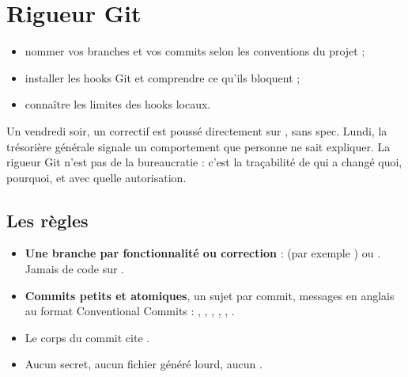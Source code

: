 \chapter{Rigueur Git}\label{ch:git}

\begin{objectifs}[Objectifs]
\begin{itemize}
  \item nommer vos branches et vos commits selon les conventions du projet ;
  \item installer les hooks Git et comprendre ce qu'ils bloquent ;
  \item connaître les limites des hooks locaux.
\end{itemize}
\end{objectifs}

\begin{situation}
Un vendredi soir, un correctif  est poussé directement sur , sans spec. Lundi, la trésorière générale
signale un comportement que personne ne sait expliquer. La rigueur Git n'est pas de la bureaucratie : c'est la
traçabilité de qui a changé quoi, pourquoi, et avec quelle autorisation.
\end{situation}

\section{Les règles}
\begin{itemize}
  \item \textbf{Une branche par fonctionnalité ou correction} :  (par exemple ) ou . Jamais de code sur .
  \item \textbf{Commits petits et atomiques}, un sujet par commit, messages en anglais au format Conventional Commits : , , , , , .
  \item Le corps du commit cite .
  \item Aucun secret, aucun fichier généré lourd, aucun .
\end{itemize}

